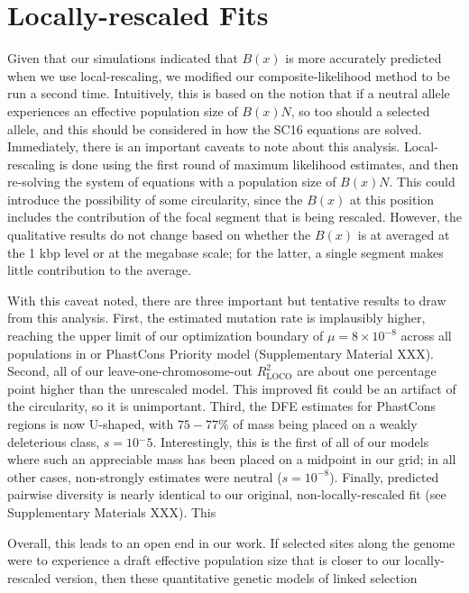 \documentclass[11pt]{article}
\begin{document}
\section*{Locally-rescaled Fits}

Given that our simulations indicated that $B(x)$ is more accurately predicted
when we use local-rescaling, we modified our composite-likelihood method to be
run a second time. Intuitively, this is based on the notion that if a neutral
allele experiences an effective population size of $B(x)N$, so too should a
selected allele, and this should be considered in how the SC16 equations are
solved. Immediately, there is an important caveats to note about this analysis.
Local-rescaling is done using the first round of maximum likelihood estimates,
and then re-solving the system of equations with a population size of $B(x)N$.
This could introduce the possibility of some circularity, since the $B(x)$ at
this position includes the contribution of the focal segment that is being
rescaled. However, the qualitative results do not change based on whether the
$B(x)$ is at averaged at the 1 kbp level or at the megabase scale; for the
latter, a single segment makes little contribution to the average.

With this caveat noted, there are three important but tentative results to draw
from this analysis. First, the estimated mutation rate is implausibly higher,
reaching the upper limit of our optimization boundary of $\mu = 8 \times
10^{-8}$ across all populations in or PhastCons Priority model (Supplementary
Material XXX). Second, all of our leave-one-chromosome-out $R_\text{LOCO}^2$
are about one percentage point higher than the unrescaled model. This improved
fit could be an artifact of the circularity, so it is unimportant. Third, the
DFE estimates for PhastCons regions is now U-shaped, with $75-77\%$ of mass
being placed on a weakly deleterious class, $s=10{^-5}$. Interestingly, this is
the first of all of our models where such an appreciable mass has been placed
on a midpoint in our grid; in all other cases, non-strongly estimates were
neutral ($s=10^{-8}$). Finally, predicted pairwise diversity is nearly
identical to our original, non-locally-rescaled fit (see Supplementary
Materials XXX). This 

Overall, this leads to an open end in our work. If selected sites along the
genome were to experience a draft effective population size that is closer to
our locally-rescaled version, then these quantitative genetic models of linked
selection 
\end{document}
